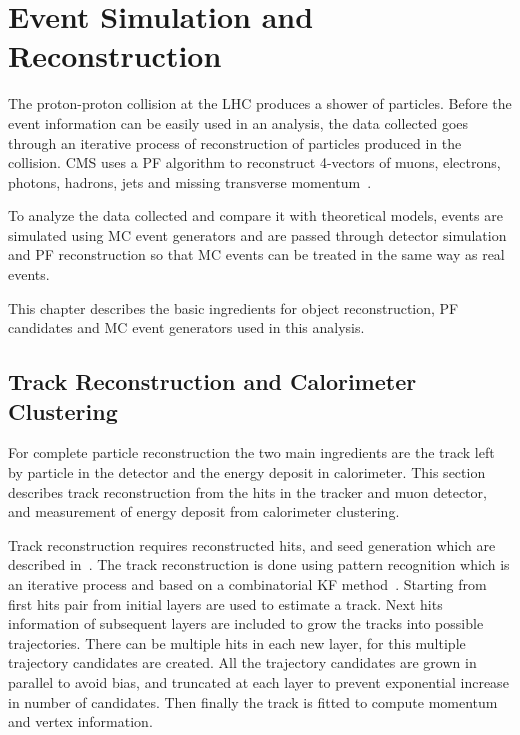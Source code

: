\chapter{
  Event Simulation and Reconstruction
 }\label{ch_reco}

The proton-proton collision at the \gls{LHC} produces a shower of particles. Before
the event information can be easily used in an analysis, the data collected goes
through an iterative process of reconstruction of particles produced in the collision.
\gls{CMS} uses a \gls{PF} algorithm to reconstruct 4-vectors of muons, electrons,
photons, hadrons, jets and missing transverse momentum~\cite{cms-particle-flow-2017}.

To analyze the data collected and compare it with theoretical models, events are
simulated using \gls{MC} event generators and are passed through detector simulation
and \gls{PF} reconstruction so that \gls{MC} events can be treated in the same way as real events.

This chapter describes the basic ingredients for object reconstruction, \gls{PF}
candidates and \gls{MC} event generators used in this analysis.

\section{
  Track Reconstruction and Calorimeter Clustering
 }\label{ch_reco:track-calo}

For complete particle reconstruction the two main ingredients are the track left by particle
in the detector and the energy deposit in calorimeter.
This section describes track reconstruction
from the hits in the tracker and muon detector, and measurement of energy deposit
from calorimeter clustering.

Track reconstruction requires reconstructed hits, and seed generation which are
described in~\cite{cms-track-vertex}. The track reconstruction is done using
pattern recognition which is an iterative process and based on a combinatorial \gls{KF} method~\cite{cms-track-reco}.
Starting from first hits pair from initial layers are used to estimate a track.
Next hits information of subsequent layers are included
to grow the tracks into possible trajectories.
There can be multiple hits in each new layer, for this multiple
trajectory candidates are created.
All the trajectory candidates are grown in parallel
to avoid bias, and truncated at each layer to prevent exponential increase
in number of candidates. Then finally the track is fitted to compute momentum
and vertex information.

